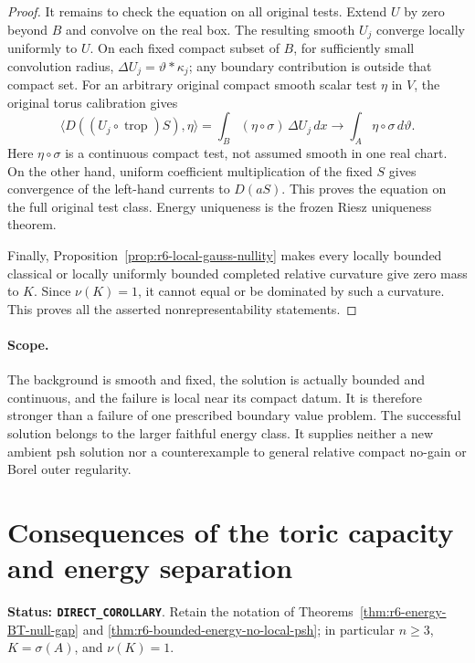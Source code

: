 \documentclass[11pt,a4paper]{article}
\numberwithin{equation}{section}
\theoremstyle{definition}
\theoremstyle{remark}
\begin{document}
\begin{proof}
It remains to check the equation on all original tests. Extend $U$
by zero beyond $B$ and convolve on the real box. The resulting smooth
$U_j$ converge locally uniformly to $U$. On each fixed compact
subset of $B$, for sufficiently small convolution radius,
$\Delta U_j=\vartheta*\kappa_j$; any boundary contribution is
outside that compact set. For an arbitrary original compact smooth
scalar test $\eta$ in $V$, the original torus calibration gives
\[
       \langle D((U_j\circ\operatorname{trop})S),\eta\rangle
           =\int_B(\eta\circ\sigma)\,\Delta U_j\,dx
           \longrightarrow\int_A\eta\circ\sigma\,d\vartheta.
\]
Here $\eta\circ\sigma$ is a continuous compact test, not assumed
smooth in one real chart. On the other hand, uniform coefficient
multiplication of the fixed $S$ gives convergence of the left-hand
currents to $D(aS)$. This proves the equation on the full original
test class. Energy uniqueness is the frozen Riesz uniqueness theorem.

Finally, Proposition~\ref{prop:r6-local-gauss-nullity} makes every
locally bounded classical or locally uniformly bounded completed
relative curvature give zero mass to $K$. Since $\nu(K)=1$, it
cannot equal or be dominated by such a curvature. This proves all
the asserted nonrepresentability statements.
\end{proof}

\paragraph{Scope.}
The background is smooth and fixed, the solution is actually bounded
and continuous, and the failure is local near its compact datum.
It is therefore stronger than a failure of one prescribed boundary
value problem. The successful solution belongs to the larger faithful
energy class. It supplies neither a new ambient psh solution nor a
counterexample to general relative compact no-gain or Borel outer
regularity.



\section{Consequences of the toric capacity and energy separation}
\label{sec:r6-energy-separation-consequences}

\noindent\textbf{Status: \texttt{DIRECT\_COROLLARY}}. Retain the
notation of Theorems~\ref{thm:r6-energy-BT-null-gap} and
\ref{thm:r6-bounded-energy-no-local-psh}; in particular $n\ge3$,
$K=\sigma(A)$, and $\nu(K)=1$.
\end{document}

